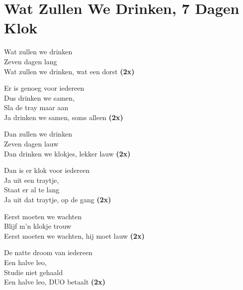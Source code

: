 \section{Wat Zullen We Drinken, 7 Dagen Klok}
Wat zullen we drinken\\
Zeven dagen lang\\
Wat zullen we drinken, wat een dorst \textbf{(2x)}

Er is genoeg voor iedereen\\
Dus drinken we samen,\\
Sla de tray maar aan\\
Ja drinken we samen, soms alleen \textbf{(2x)}

Dan zullen we drinken\\
Zeven dagen lauw\\
Dan drinken we klokjes, lekker lauw \textbf{(2x)}

Dan is er klok voor iedereen\\
Ja uit een traytje,\\
Staat er al te lang\\
Ja uit dat traytje, op de gang \textbf{(2x)}

Eerst moeten we wachten\\
Blijf m'n klokje trouw\\
Eerst moeten we wachten, hij moet lauw \textbf{(2x)}

De natte droom van iedereen\\
Een halve leo,\\
Studie niet gehaald\\
Een halve leo, DUO betaalt \textbf{(2x)}

